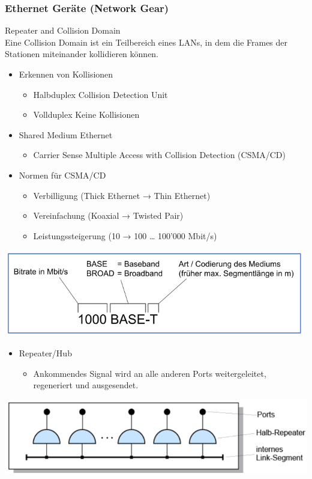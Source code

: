 \subsubsection{Ethernet Geräte (Network Gear)}

\begin{concept}{Repeater and Collision Domain}\\
    Eine Collision Domain ist ein Teilbereich eines LANs, in dem die Frames der Stationen miteinander kollidieren können.
    \begin{itemize}
        \item Erkennen von Kollisionen
        \begin{itemize}
            \item Halbduplex Collision Detection Unit
            \item Vollduplex Keine Kollisionen
        \end{itemize}
        \item Shared Medium Ethernet
        \begin{itemize}
            \item Carrier Sense Multiple Access with Collision Detection (CSMA/CD)
        \end{itemize}
        \item Normen für CSMA/CD
        \begin{itemize}
            \item Verbilligung (Thick Ethernet → Thin Ethernet)
            \item Vereinfachung (Koaxial → Twisted Pair)
            \item Leistungssteigerung (10 → 100 … 100’000 Mbit/s)
        \end{itemize}
    \end{itemize}
        \includegraphics[width=0.75\linewidth]{images/normen_csmacd.png}
    \begin{itemize}
        \item Repeater/Hub
        \begin{itemize}
            \item Ankommendes Signal wird an alle anderen Ports weitergeleitet, regeneriert und ausgesendet. 
        \end{itemize}
    \end{itemize}
        \includegraphics[width=0.75\linewidth]{images/repeater_hub.png}
\end{concept}

